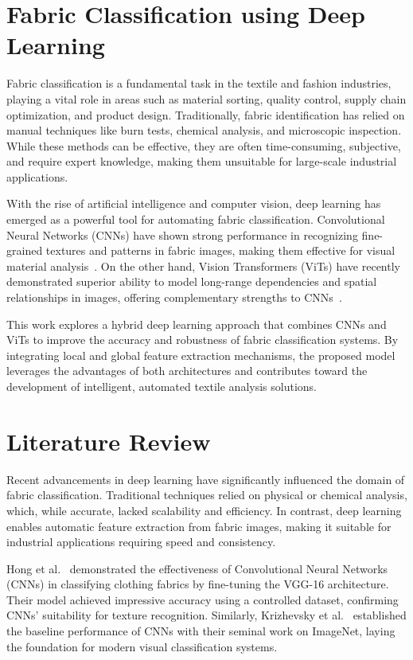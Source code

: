 \section{Fabric Classification using Deep Learning}

Fabric classification is a fundamental task in the textile and fashion industries, playing a vital role in areas such as material sorting, quality control, supply chain optimization, and product design. Traditionally, fabric identification has relied on manual techniques like burn tests, chemical analysis, and microscopic inspection. While these methods can be effective, they are often time-consuming, subjective, and require expert knowledge, making them unsuitable for large-scale industrial applications.

With the rise of artificial intelligence and computer vision, deep learning has emerged as a powerful tool for automating fabric classification. Convolutional Neural Networks (CNNs) have shown strong performance in recognizing fine-grained textures and patterns in fabric images, making them effective for visual material analysis~\cite{hong2020cnn, krizhevsky2012imagenet}. On the other hand, Vision Transformers (ViTs) have recently demonstrated superior ability to model long-range dependencies and spatial relationships in images, offering complementary strengths to CNNs~\cite{dosovitskiy2020vit, chitra2022vit}.

This work explores a hybrid deep learning approach that combines CNNs and ViTs to improve the accuracy and robustness of fabric classification systems. By integrating local and global feature extraction mechanisms, the proposed model leverages the advantages of both architectures and contributes toward the development of intelligent, automated textile analysis solutions.

\section*{Literature Review}

Recent advancements in deep learning have significantly influenced the domain of fabric classification. Traditional techniques relied on physical or chemical analysis, which, while accurate, lacked scalability and efficiency. In contrast, deep learning enables automatic feature extraction from fabric images, making it suitable for industrial applications requiring speed and consistency.

Hong et al.~\cite{hong2020cnn} demonstrated the effectiveness of Convolutional Neural Networks (CNNs) in classifying clothing fabrics by fine-tuning the VGG-16 architecture. Their model achieved impressive accuracy using a controlled dataset, confirming CNNs’ suitability for texture recognition. Similarly, Krizhevsky et al.~\cite{krizhevsky2012imagenet} established the baseline performance of CNNs with their seminal work on ImageNet, laying the foundation for modern visual classification systems.


